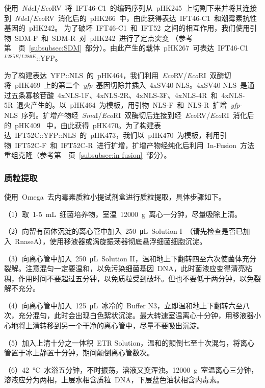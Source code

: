 使用\ \textit{Nde}I/\textit{Eco}RV\ 将\ IFT46-C1\ 的编码序列从\ pHK245\ 上切割下来并将其连接到\ \textit{Nde}I/\textit{Eco}RV\ 消化后的\ pHK266\ 中，由此获得表达\ IFT46-C1\ 和潮霉素抗性基因的\ pHK242。 为了破坏\ IFT46-C1\ 和\ IFT52\ 之间的相互作用，我们使用引物\ SDM-F\ 和\ SDM-R\ 对\ pHK242\ 进行了定点突变
（参考第\ \pageref{subsubsec:SDM}\ 页\ \ref{subsubsec:SDM}\ 部分）。由此产生的载体\ pHK267\ 可表达\ IFT46-C1$^{L285E/L286E}$::YFP。

为了构建表达\ YFP::NLS\ 的\ pHK464，我们利用\ \textit{Eco}RV/\textit{Eco}RI\ 双酶切将\ pHK469\ 上的第二个\ \textit{yfp}\ 基因切除并插入\ 4xSV40 NLS。4xSV40 NLS\ 是通过五条寡核苷酸\ 4xNLS-1F、4xNLS-2R、4xNLS-3F、4xNLS-4R\ 和\ 4xNLS-5R\ 退火产生的。以\ pHK464\ 为模板，用引物\ NLS-F\ 和\ NLS-R\ 扩增\ \textit{yfp}-NLS\ 序列。扩增产物经\
\textit{Sma}I/\textit{Eco}RI\ 双酶切后连接到经\ \textit{Eco}RV/\textit{Eco}RI\ 消化后的\ pHK409 \ 中，由此获得\ pHK470。为了构建表达\ IFT52C::YFP::NLS\ 的\ pHK473，我们以\ pHK470\ 为模板，利用引物\ IFT52C-F\ 和\ IFT52C-R\ 进行扩增，扩增产物经纯化后利用\ In-Fusion\ 方法重组克隆（参考第\ \pageref{subsubsec:in fusion}\ 页\ \ref{subsubsec:in fusion}\ 部分）。

\subsubsection{质粒提取}
使用\ Omega\ 去内毒素质粒小提试剂盒进行质粒提取，具体步骤如下。

（1）取\ 1-\SI{5}{\mL}\ 细菌培养物，室温\ \SI{12000}{\g}\ 离心一分钟，尽量吸除上清。

（2）向留有菌体沉淀的离心管中加入\ \SI{250}{\uL}\ Solution I\ （请先检查是否已加入\ RnaseA），使用移液器或涡旋振荡器彻底悬浮细菌细胞沉淀。

（3）向离心管中加入\ \SI{250}{\uL}\ Solution II，温和地上下翻转四至六次使菌体充分裂解。注意混匀一定要温和，以免污染细菌基因\ DNA，此时菌液应变得清亮粘稠，作用时间不要超过五分钟，以免质粒受到破坏。但也不要低于两分钟，以免裂解不充分。

（4）向离心管中加入\ \SI{125}{\uL}\ 冰冷的\ Buffer N3，立即温和地上下翻转六至八次，充分混匀，此时会出现白色絮状沉淀。最大转速室温离心十分钟，用移液器小心地将上清转移到另一个干净的离心管中，尽量不要吸出沉淀。

（5）加入上清十分之一体积\ ETR Solution，温和的颠倒七至十次混匀，将离心管置于冰上静置十分钟，期间颠倒离心管数次。

 （6）\SI{42}{\degreeCelsius}\ 水浴五分钟，不时振荡，溶液又变浑浊。\SI{12000}{\g}\ 室温离心三分钟，溶液应分为两相，上层水相含质粒\ DNA，下层蓝色油状相含内毒素。

